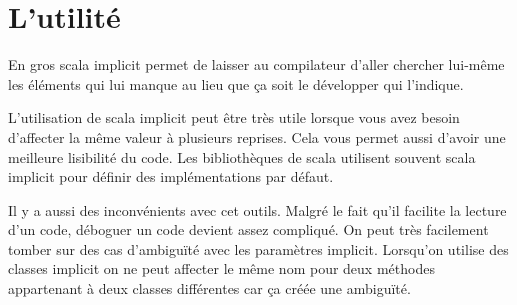 \documentclass[12pt]{article}
\begin{document}
\vspace{\baselineskip}
\section*{L’utilité}

\vspace{\baselineskip}
En gros scala implicit permet de laisser au compilateur d’aller chercher lui-même les éléments qui lui manque au lieu que ça soit le développer qui l’indique.\par

L’utilisation de scala implicit peut être très utile lorsque vous avez besoin d’affecter la même valeur à plusieurs reprises. Cela vous permet aussi d’avoir une meilleure lisibilité du code. Les bibliothèques de scala utilisent souvent scala implicit pour définir des implémentations par défaut. \par

Il y a aussi des inconvénients avec cet outils. Malgré le fait qu’il facilite la lecture d’un code, déboguer un code devient assez compliqué. On peut très facilement tomber sur des cas d’ambiguïté avec les paramètres implicit. Lorsqu’on utilise des classes implicit on ne peut affecter le même nom pour deux méthodes appartenant à deux classes différentes car ça créée une ambiguïté. \par


\printbibliography
\end{document}
